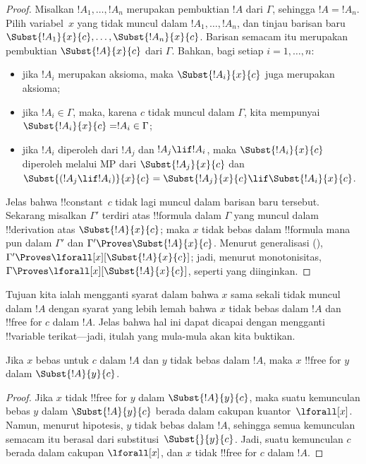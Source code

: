 \documentclass[../../../include/open-logic-section]{subfiles}
\begin{document}
\begin{proof} Misalkan $!A_1,\ldots,!A_n$ merupakan pembuktian $!A$ dari
$\Gamma$, sehingga $!A=!A_n$. Pilih variabel~$x$ yang tidak muncul dalam
$!A_1,\ldots,!A_n$, dan tinjau barisan baru
$\Subst{!A_1}{x}{c},\ldots,\Subst{!A_n}{x}{c}$. Barisan semacam itu merupakan
pembuktian $\Subst{!A}{x}{c}$ dari $\Gamma$. Bahkan, bagi setiap
$i=1,\ldots,n$:
\begin{itemize}
\item jika $!A_i$ merupakan aksioma, maka $\Subst{!A_i}{x}{c}$ juga
merupakan aksioma;
\item jika $!A_i \in \Gamma$, maka, karena $c$ tidak muncul dalam
$\Gamma$, kita mempunyai $\Subst{!A_i}{x}{c} = !A_i \in \Gamma$;
\item jika $!A_i$ diperoleh dari $!A_j$ dan $!A_j \lif !A_i$, maka
$\Subst{!A_i}{x}{c}$ diperoleh melalui MP dari $\Subst{!A_j}{x}{c}$ dan
$\Subst{(!A_j \lif !A_i)}{x}{c}
= \Subst{!A_j}{x}{c} \lif \Subst{!A_i}{x}{c}$.
\end{itemize}
Jelas bahwa !!{constant}~$c$ tidak lagi muncul dalam barisan baru tersebut.
Sekarang misalkan $\Gamma'$ terdiri atas !!{formula} dalam $\Gamma$ yang
muncul dalam !!{derivation} atas $\Subst{!A}{x}{c}$; maka $x$ tidak bebas
dalam !!{formula} mana pun dalam $\Gamma'$ dan
$\Gamma' \Proves \Subst{!A}{x}{c}$. Menurut generalisasi
(),
$\Gamma' \Proves \lforall[x][\Subst{!A}{x}{c}]$; jadi, menurut
monotonisitas, $\Gamma \Proves \lforall[x][\Subst{!A}{x}{c}]$, seperti
yang diinginkan.
\end{proof}

\begin{explain}
Tujuan kita ialah mengganti syarat dalam  bahwa $x$ sama
sekali tidak muncul dalam $!A$ dengan syarat yang lebih lemah bahwa $x$ tidak
bebas dalam $!A$ dan !!{free for} $c$ dalam $!A$. Jelas bahwa hal ini dapat
dicapai dengan mengganti !!{variable} terikat---jadi, itulah yang mula-mula
akan kita buktikan.
\end{explain}

\begin{lem}
Jika $x$ bebas untuk $c$ dalam $!A$ dan $y$ tidak bebas dalam $!A$, maka
$x$ !!{free for} $y$ dalam $\Subst{!A}{y}{c}$.
\end{lem}

\begin{proof} Jika $x$ tidak !!{free for} $y$ dalam
$\Subst{!A}{y}{c}$, maka suatu kemunculan bebas $y$ dalam
$\Subst{!A}{y}{c}$ berada dalam cakupan kuantor~$\lforall[x]$. Namun,
menurut hipotesis, $y$ tidak bebas dalam $!A$, sehingga semua kemunculan
semacam itu berasal dari substitusi~$\Subst{}{y}{c}$. Jadi, suatu kemunculan
$c$ berada dalam cakupan $\lforall[x]$, dan $x$ tidak !!{free for} $c$
dalam $!A$.
\end{proof}
\end{document}
